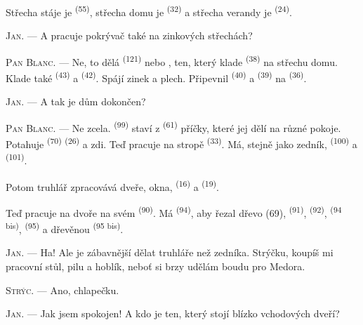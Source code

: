 Střecha stáje je  \textsuperscript{(55)}, střecha domu je
 \textsuperscript{(32)} a střecha verandy je 
\textsuperscript{(24)}.

\textsc{Jan}. --- A pracuje pokrývač také na zinkových střechách?

\textsc{Pan Blanc}. --- Ne, to dělá  \textsuperscript{(121)} nebo
, ten, který klade  \textsuperscript{(38)} na střechu
domu. Klade také  \textsuperscript{(43)} a  \textsuperscript{(42)}. Spájí zinek a plech. Připevnil 
\textsuperscript{(40)} a  \textsuperscript{(39)} na
 \textsuperscript{(36)}.

\textsc{Jan}. --- A tak je dům dokončen?

\VUsaut{3.0mm}
\VUsaut{3.0mm}

\textsc{Pan Blanc}. --- Ne zcela.  \textsuperscript{(99)} staví z
 \textsuperscript{(61)} příčky, které jej dělí na různé pokoje. Potahuje
 \textsuperscript{(70)}  \textsuperscript{(26)} a zdi.
Teď pracuje na stropě  \textsuperscript{(33)}. Má, stejně jako zedník,
 \textsuperscript{(100)} a 
\textsuperscript{(101)}.

Potom truhlář zpracovává dveře, okna,  \textsuperscript{(16)} a
 \textsuperscript{(19)}.

Teď pracuje na dvoře na svém  \textsuperscript{(90)}. Má
 \textsuperscript{(94)}, aby řezal dřevo (69), 
\textsuperscript{(91)},  \textsuperscript{(92)}, 
\textsuperscript{(94 bis)},  \textsuperscript{(95)} a dřevěnou
 \textsuperscript{(95 bis)}.

\textsc{Jan}. --- Ha! Ale je zábavnější dělat truhláře než zedníka. Strýčku, koupíš mi
pracovní stůl, pilu a hoblík, neboť si brzy udělám boudu pro Medora.

\textsc{Strýc}. --- Ano, chlapečku.

\textsc{Jan}. --- Jak jsem spokojen! A kdo je ten, který stojí blízko vchodových dveří?

